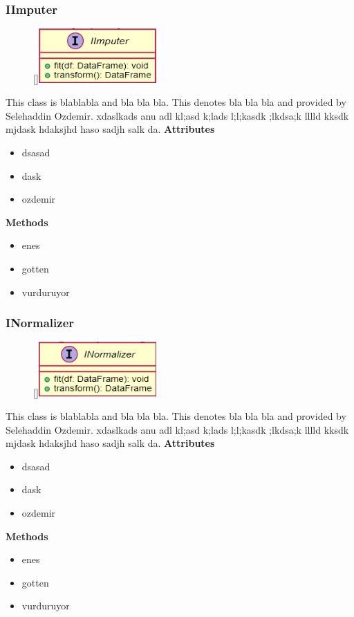 \subsubsection{IImputer}
\begin{figure}
    \raisebox{0pt}[\dimexpr{}\baselineskip\relax]{\includegraphics[width=4.5cm]{classes/model-management/9.png}}
\end{figure} 
\par
This class is blablabla and bla bla bla. This denotes bla bla bla and provided by Selehaddin Ozdemir. xdaslkads anu adl kl;asd k;lads l;l;kasdk ;lkdsa;k lllld kksdk mjdask hdaksjhd haso sadjh salk da.
\newline
\newline
\textbf{Attributes}
\begin{itemize}
    \item dsasad
    \item dask
    \item ozdemir
\end{itemize}
\textbf{Methods}
\begin{itemize}
    \item enes
    \item gotten
    \item vurduruyor
\end{itemize}

\subsubsection{INormalizer}
\begin{figure}
    \raisebox{0pt}[\dimexpr{}\baselineskip\relax]{\includegraphics[width=4.5cm]{classes/model-management/10.png}}
\end{figure} 
\par
This class is blablabla and bla bla bla. This denotes bla bla bla and provided by Selehaddin Ozdemir. xdaslkads anu adl kl;asd k;lads l;l;kasdk ;lkdsa;k lllld kksdk mjdask hdaksjhd haso sadjh salk da.
\newline
\newline
\textbf{Attributes}
\begin{itemize}
    \item dsasad
    \item dask
    \item ozdemir
\end{itemize}
\textbf{Methods}
\begin{itemize}
    \item enes
    \item gotten
    \item vurduruyor
\end{itemize}

